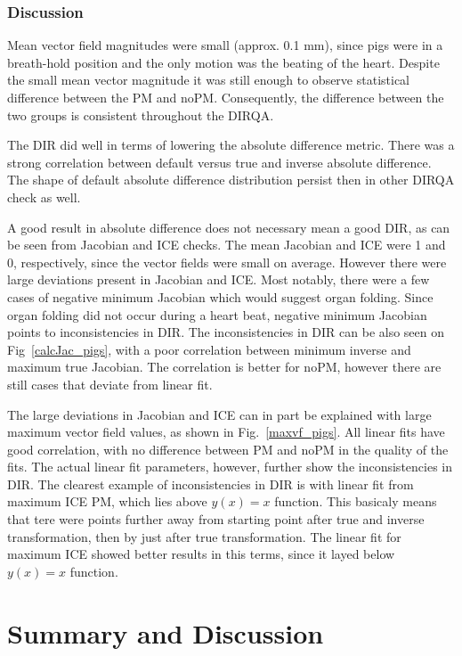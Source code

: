 \documentclass[type=dr, dr=rernat, accentcolor=tud7b,colorbacktitle, bigchapter, openright, twoside, 12pt ]{tudthesis}
\begin{document}
\subsubsection{Discussion}

Mean vector field magnitudes were small (approx. 0.1 mm), since pigs were in a breath-hold position and the only motion was the beating of the heart. 
Despite the small mean vector magnitude it was still enough to observe statistical difference between the PM and noPM.
Consequently, the difference between the two groups is consistent throughout the DIRQA.

The DIR did well in terms of lowering the absolute difference metric. There was a strong correlation between default versus true and inverse absolute difference. The shape of default absolute difference
distribution persist then in other DIRQA check as well.

A good result in absolute difference does not necessary mean a good DIR, as can be seen from Jacobian and ICE checks. The mean Jacobian and ICE were 1 and 0, respectively, since the
vector fields were small on average. However there were large deviations present in Jacobian and ICE. Most notably, there were a few cases of negative minimum Jacobian which would suggest 
organ folding. Since organ folding did not occur during a heart beat, negative minimum Jacobian points to inconsistencies in DIR. The inconsistencies in DIR can be also seen on Fig~\ref{calcJac_pigs},
with a poor correlation between minimum inverse and maximum true Jacobian. The correlation is better for noPM, however there are still cases that deviate from linear fit.

The large deviations in Jacobian and ICE can in part be explained with large maximum vector field values, as shown in Fig.~\ref{maxvf_pigs}. All linear fits have good correlation, with no
difference between PM and noPM in the quality of the fits. The actual linear fit parameters, however, further show the inconsistencies in DIR. The clearest example of inconsistencies in
DIR is with linear fit from maximum ICE PM, which lies above $y(x)=x$ function. This basicaly means that tere were points further away from starting point after true and inverse transformation, 
then by just after true transformation. The linear fit for maximum ICE showed better results in this terms, since it layed below $y(x)=x$ function.




\section{Summary and Discussion}





{}
% 
\end{document}
